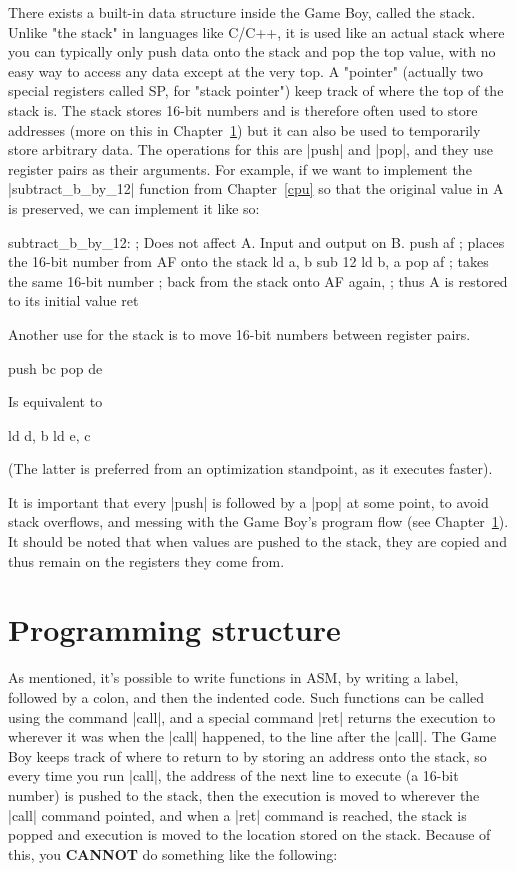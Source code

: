 \documentclass[11pt]{book}
\begin{document}
There exists a built-in data structure inside the Game Boy, called the stack. Unlike "the stack" in languages like C/C++, it is used like an actual stack where you can typically only push data onto the stack and pop the top value, with no easy way to access any data except at the very top. A "pointer" (actually two special registers called SP, for "stack pointer") keep track of where the top of the stack is. The stack stores 16-bit numbers and is therefore often used to store addresses (more on this in Chapter~\ref{progstruct}) but it can also be used to temporarily store arbitrary data. The operations for this are |push| and |pop|, and they use register pairs as their arguments. For example, if we want to implement the |subtract_b_by_12| function from Chapter~\ref{cpu} so that the original value in A is preserved, we can implement it like so:

\begin{code}
subtract_b_by_12:
  ; Does not affect A. Input and output on B.
  push af ; places the 16-bit number from AF onto the stack
  ld a, b
  sub 12
  ld b, a
  pop af ; takes the same 16-bit number
  ; back from the stack onto AF again,
  ; thus A is restored to its initial value
  ret 
\end{code}

Another use for the stack is to move 16-bit numbers between register pairs. 

\begin{code}
push bc
pop de
\end{code}

Is equivalent to 

\begin{code}
ld d, b
ld e, c
\end{code}

(The latter is preferred from an optimization standpoint, as it executes faster).

It is important that every |push| is followed by a |pop| at some point, to avoid stack overflows, and messing with the Game Boy’s program flow (see Chapter~\ref{progstruct}). It should be noted that when values are pushed to the stack, they are copied and thus remain on the registers they come from. 

\section{Programming structure}
\label{progstruct} 
As mentioned, it's possible to write functions in ASM, by writing a label, followed by a colon, and then the indented code. Such functions can be called using the command |call|, and a special command |ret| returns the execution to wherever it was when the |call| happened, to the line after the |call|. The Game Boy keeps track of where to return to by storing an address onto the stack, so every time you run |call|, the address of the next line to execute (a 16-bit number) is pushed to the stack, then the execution is moved to wherever the |call| command pointed, and when a |ret| command is reached, the stack is popped and execution is moved to the location stored on the stack. Because of this, you \textbf{CANNOT} do something like the following:
\end{document}
